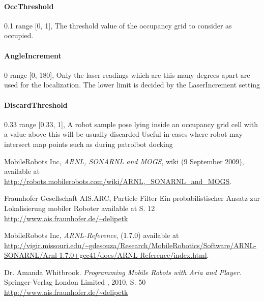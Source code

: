 \documentclass{article}
\begin{document}
\paragraph{OccThreshold} 0.1          range [0, 1],  The threshold value of the occupancy
                          grid to consider as occupied.

\paragraph{AngleIncrement} 0          range [0, 180],  Only the laser readings which are
                          this many degrees apart are used for the
                          localization. The lower limit is decided by the
                          LaserIncrement setting

\paragraph{DiscardThreshold} 0.33     range [0.33, 1],  A robot sample pose lying inside
                          an occupancy grid cell with a value above this will
                          be usually discarded Useful in cases where robot may
                          intersect map points such as during patrolbot
                          docking





\begin{thebibliography}{------}
	 MobileRobots Inc, \emph{ARNL, SONARNL and MOGS},  wiki (9 September 2009), available at 
		\url{http://robots.mobilerobots.com/wiki/ARNL,_SONARNL_and_MOGS}.
	
	
	
	 Fraunhofer Gesellschaft AIS.ARC, Particle Filter
			Ein probabilistischer Ansatz zur Lokalisierung mobiler Roboter available at S. 12
			\url{http://www.ais.fraunhofer.de/~delipetk}
	
	
	
	
	
	 MobileRobots Inc, \emph{ARNL-Reference}, (1.7.0) available at 				
	\url{http://vigir.missouri.edu/~gdesouza/Research/MobileRobotics/Software/ARNL-SONARNL/Arnl-1.7.0+gcc41/docs/ARNL-Reference/index.html}.
	
	
	
	
		Dr. Amanda Whitbrook.
		{\em Programming Mobile Robots with Aria and Player}.
		Springer-Verlag London Limited , 2010, S. 50
		\url{http://www.ais.fraunhofer.de/~delipetk}

\end{thebibliography}
\listoffigures
\end{document}
